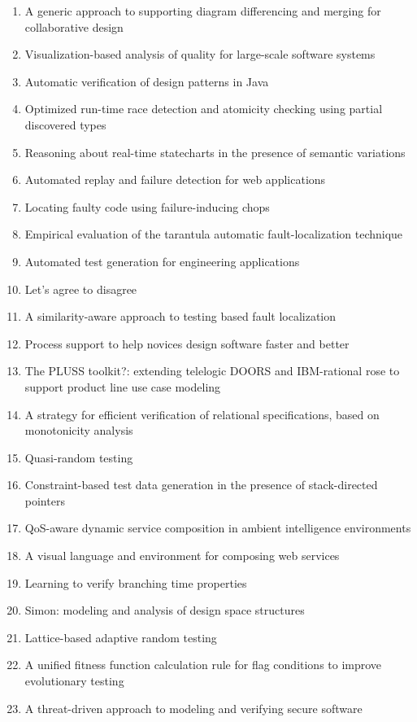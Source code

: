 \begin{enumerate}[itemsep=-1ex]
  \item A generic approach to supporting diagram differencing and merging for collaborative design
  \item Visualization-based analysis of quality for large-scale software systems
  \item Automatic verification of design patterns in Java
  \item Optimized run-time race detection and atomicity checking using partial discovered types
  \item Reasoning about real-time statecharts in the presence of semantic variations
  \item Automated replay and failure detection for web applications
  \item Locating faulty code using failure-inducing chops
  \item Empirical evaluation of the tarantula automatic fault-localization technique
  \item Automated test generation for engineering applications
  \item Let's agree to disagree
  \item A similarity-aware approach to testing based fault localization
  \item Process support to help novices design software faster and better
  \item The PLUSS toolkit?: extending telelogic DOORS and IBM-rational rose to support product line use case modeling
  \item A strategy for efficient verification of relational specifications, based on monotonicity analysis
  \item Quasi-random testing
  \item Constraint-based test data generation in the presence of stack-directed pointers
  \item QoS-aware dynamic service composition in ambient intelligence environments
  \item A visual language and environment for composing web services
  \item Learning to verify branching time properties
  \item Simon: modeling and analysis of design space structures
  \item Lattice-based adaptive random testing
  \item A unified fitness function calculation rule for flag conditions to improve evolutionary testing
  \item A threat-driven approach to modeling and verifying secure software

\end{enumerate}
